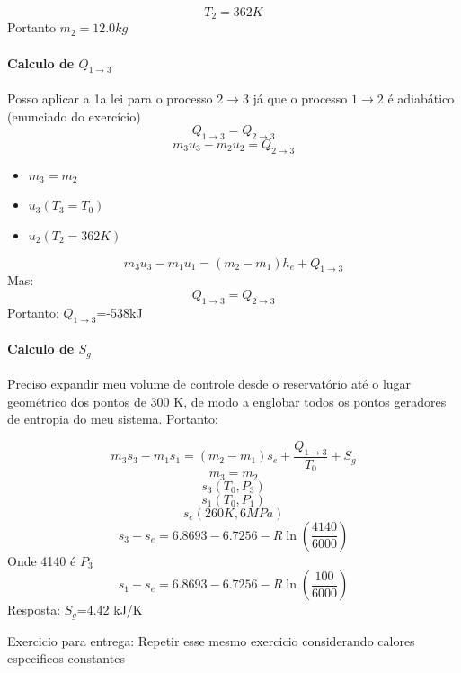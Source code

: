 \documentclass[a4paper, 12pt]{article}
\begin{document}
 \[ T_{2}=362 K\]
Portanto $m_{2}=12.0kg$

\paragraph*{Calculo de $Q_{1 \rightarrow 3}$}

Posso aplicar a 1a lei para o processo $2 \rightarrow 3$ já que o processo $1 \rightarrow 2$ é adiabático (enunciado do exercício)
\[Q_{1 \rightarrow 3} = Q_{2 \rightarrow 3}\]
\[m_{3}u_{3}-m_{2}u_{2}=Q_{2 \rightarrow 3}\]
\begin{itemize}
\item $m_{3}=m_{2}$
\item $u_{3}(T_{3}=T_{0})$
\item $u_{2}(T_{2}=362 K)$
\end{itemize}

\[m_{3}u_{3}-m_{1}u_{1}=(m_{2}-m_{1})h_{e}+Q_{1 \rightarrow 3}\]
Mas:
\[Q_{1 \rightarrow 3} = Q_{2 \rightarrow 3}\]
Portanto: $Q_{1 \rightarrow 3}$=-538kJ

\paragraph*{Calculo de $S_{g}$}

Preciso expandir meu volume de controle desde o reservatório até o lugar geométrico dos pontos de 300 K, de modo a englobar todos os pontos geradores de entropia do meu sistema.
Portanto:

\[m_{3}s_{3}-m_{1}s_{1}=(m_{2}-m_{1})s_{e}+\frac{Q_{1 \rightarrow 3}}{T_{0}}+S_{g}\]
\[m_{3}=m_{2}\]
\[s_{3}(T_{0},P_{3})\]
\[s_{1}(T_{0},P_{1})\]
\[s_{e}(260K,6MPa)\]
\[s_{3}-s_{e}=6.8693-6.7256-R\ln(\frac{4140}{6000})\]
Onde 4140 é $P_{3}$
\[s_{1}-s_{e}=6.8693-6.7256-R\ln(\frac{100}{6000})\]
Resposta: $S_{g}$=4.42 kJ/K


Exercicio para entrega: Repetir esse mesmo exercicio considerando calores especificos constantes
\end{document}
